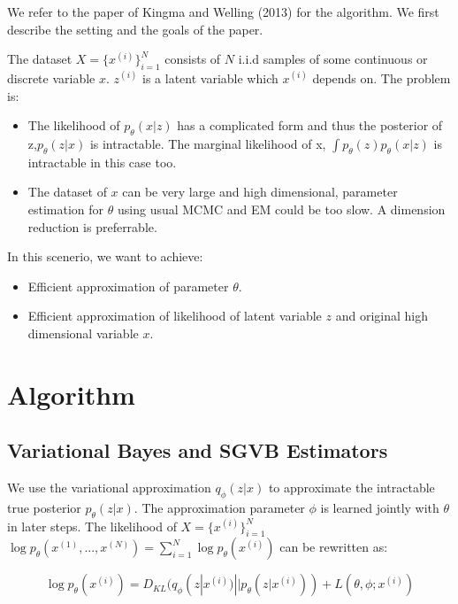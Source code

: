 \documentclass[11pt]{article}
\begin{document}
We refer to the paper of Kingma and Welling (2013) for the algorithm. We first describe the setting and the goals of the paper. 
\newline

\noindent
The dataset $X = \{x^{(i)}\}^N_{i=1}$ consists of $N$ i.i.d samples of some continuous or discrete variable $x$.  $z^{(i)}$ is a latent variable which $x^{(i)}$ depends on. The problem is: 
\begin{itemize}
\item The likelihood of $p_{\theta}(x|z)$ has a complicated form and thus the posterior of z,$p_{\theta}(z|x)$ is intractable. The marginal likelihood of x, $\int p_{\theta}(z)p_{\theta}(x|z)$ is intractable in this case too.
\item The dataset of $x$ can be very large and high dimensional, parameter estimation for $\theta$ using usual MCMC and EM could be too slow. A dimension reduction is preferrable.
\end{itemize}


\noindent
In this scenerio, we want to achieve: 
\begin{itemize}
\item Efficient approximation of parameter ${\theta}$.
\item Efficient approximation of likelihood of latent variable $z$ and original high dimensional variable $x$.
\end{itemize}


\section{Algorithm}

\subsection{Variational Bayes and SGVB Estimators} 

\noindent
We use the variational approximation $q_{\phi}(z|x)$ to approximate the intractable true posterior $p_{\theta}(z|x)$. The approximation parameter $\phi$ is learned jointly with $\theta$ in later steps. The likelihood of  $X = \{x^{(i)}\}^N_{i=1}$ $\log p_\theta(x^{(1)},...,x^{(N)})=\sum^N_{i=1}\log p_\theta(x^{(i)})$ can be rewritten as:

\begin{equation}
\log p_\theta(x^{(i)})=D_{KL}(q_\phi(z|x^{(i)})||p_\theta(z|x^{(i)}))+L(\theta, \phi; x^{(i)})
\end{equation}
\end{document}
